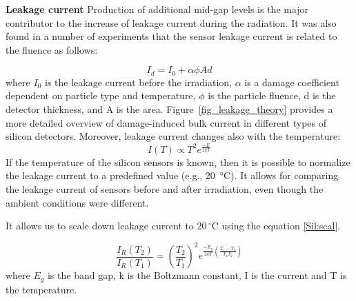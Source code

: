 \textbf{Leakage current}\bigbreak
Production of additional mid-gap levels is the major contributor to the increase of leakage current during the radiation. It was also found in a number of experiments that the sensor leakage current is related to the fluence as follows:

\begin{equation}
\label{eq:fluence}
    I_{d} = I_{0} + \alpha \phi Ad
\end{equation}
where $I_{0}$ is the leakage current before the irradiation, $\alpha$ is a damage coefficient dependent on particle type and temperature, $\phi$ is the particle fluence, d is the detector thickness, and A is the area. Figure~\ref{fig_leakage_theory} provides a more detailed overview of damage-induced bulk current in different types of silicon detectors. Moreover, leakage current changes also with the temperature:
\begin{equation}
\label{Sil:temp}
    I(T) \propto T^{2}e^{\frac{-E}{2kT}}
\end{equation}
If the temperature of the silicon sensors is known, then it is possible to normalize the leakage current to a predefined value (e.g., \SI{20}{\celsius}). It allows for comparing the leakage current of sensors before and after irradiation, even though the ambient conditions were different. 

It allows us to scale down leakage current to $20\,^{\circ}$C using the equation \ref{Sil:scal}.
 
\begin{equation}
\label{Sil:scal}
    \frac{I_{R}(T_{2})}{I_{R}(T_{1})} = (\frac{T_{2}}{T_{1}})^{2}e^{\frac{-E_{g}}{2kT}(\frac{T_{1}-T_{2}}{T_{1}T_{2}})}
\end{equation}
where $E_{g}$ is the band gap, k is the Boltzmann constant, I is the current and T is the temperature.

